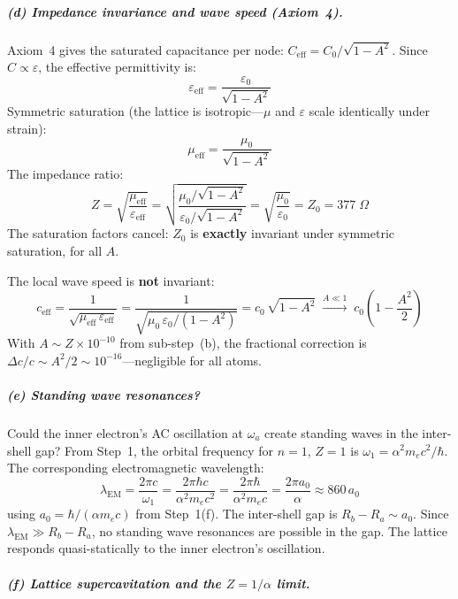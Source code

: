 \subparagraph{(d) Impedance invariance and wave speed (Axiom~4).}
Axiom~4 gives the saturated capacitance per node:
$C_{\text{eff}} = C_0 / \sqrt{1 - A^2}$.
Since $C \propto \varepsilon$, the effective permittivity is:
\begin{equation}
    \varepsilon_{\text{eff}}
    = \frac{\varepsilon_0}{\sqrt{1 - A^2}}
\end{equation}
Symmetric saturation (the lattice is isotropic---$\mu$ and
$\varepsilon$ scale identically under strain):
\begin{equation}
    \mu_{\text{eff}}
    = \frac{\mu_0}{\sqrt{1 - A^2}}
\end{equation}
The impedance ratio:
\begin{equation}
    Z = \sqrt{\frac{\mu_{\text{eff}}}{\varepsilon_{\text{eff}}}}
    = \sqrt{\frac{\mu_0 / \sqrt{1-A^2}}
    {\varepsilon_0 / \sqrt{1-A^2}}}
    = \sqrt{\frac{\mu_0}{\varepsilon_0}}
    = Z_0 = 377\;\Omega
    \label{eq:Z0_invariant}
\end{equation}
The saturation factors cancel: $Z_0$ is \textbf{exactly}
invariant under symmetric saturation, for all $A$.

The local wave speed is \textbf{not} invariant:
\begin{equation}
    c_{\text{eff}}
    = \frac{1}{\sqrt{\mu_{\text{eff}}\,\varepsilon_{\text{eff}}}}
    = \frac{1}{\sqrt{\mu_0\,\varepsilon_0 / (1-A^2)}}
    = c_0\,\sqrt{1 - A^2}
    \;\xrightarrow{A \ll 1}\;
    c_0\!\left(1 - \frac{A^2}{2}\right)
    \label{eq:c_eff}
\end{equation}
With $A \sim Z \times 10^{-10}$ from sub-step~(b),
the fractional correction is
$\Delta c / c \sim A^2/2 \sim 10^{-16}$---negligible
for all atoms.

\subparagraph{(e) Standing wave resonances?}
Could the inner electron's AC oscillation at $\omega_a$ create
standing waves in the inter-shell gap?  From Step~1,
the orbital frequency for $n = 1$, $Z = 1$ is
$\omega_1 = \alpha^2 m_e c^2 / \hbar$.
The corresponding electromagnetic wavelength:
\begin{equation}
    \lambda_{\text{EM}}
    = \frac{2\pi c}{\omega_1}
    = \frac{2\pi \hbar c}{\alpha^2 m_e c^2}
    = \frac{2\pi \hbar}{\alpha^2 m_e c}
    = \frac{2\pi a_0}{\alpha}
    \approx 860\,a_0
\end{equation}
using $a_0 = \hbar / (\alpha m_e c)$ from Step~1(f).
The inter-shell gap is $R_b - R_a \sim a_0$.  Since
$\lambda_{\text{EM}} \gg R_b - R_a$, no standing wave
resonances are possible in the gap.  The lattice responds
quasi-statically to the inner electron's oscillation.
\subparagraph{(f) Lattice supercavitation and the $Z = 1/\alpha$ limit.}

